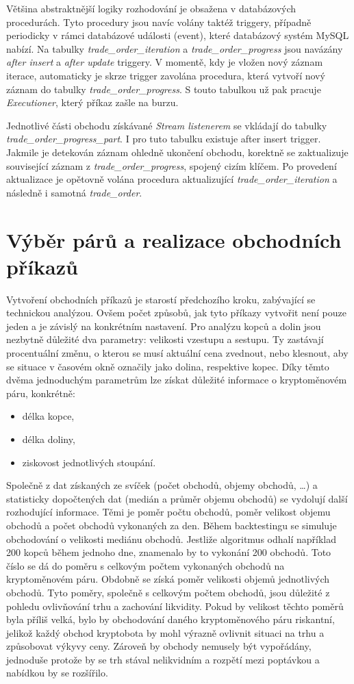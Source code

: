 Většina abstraktnější logiky rozhodování je obsažena v databázových procedurách. Tyto procedury jsou navíc volány taktéž triggery, případně periodicky v rámci databázové události (event), které
databázový systém MySQL nabízí. Na tabulky \emph{trade\_order\_iteration} a \emph{trade\_order\_progress} jsou navázány \emph{after insert} a \emph{after update} triggery. V momentě, kdy je vložen
nový záznam iterace, automaticky je skrze trigger zavolána procedura, která vytvoří nový záznam do tabulky \emph{trade\_order\_progress}. S touto tabulkou už pak pracuje \emph{Executioner}, který
příkaz zašle na burzu.

Jednotlivé části obchodu získávané \emph{Stream listenerem} se vkládají do tabulky \emph{trade\_order\_progress\_part}. I pro tuto tabulku existuje after insert trigger. Jakmile je detekován
záznam ohledně ukončení obchodu, korektně se zaktualizuje související záznam z \emph{trade\_order\_progress}, spojený cizím klíčem. Po provedení aktualizace je opětovně volána procedura aktualizující
\emph{trade\_order\_iteration} a následně i samotná \emph{trade\_order}.


\section{Výběr párů a realizace obchodních příkazů}
\label{subsec:trade-orders}
Vytvoření obchodních příkazů je starostí předchozího kroku, zabývající se technickou analýzou. Ovšem počet způsobů, jak tyto příkazy vytvořit není pouze jeden a je závislý na konkrétním
nastavení. Pro analýzu kopců a dolin jsou nezbytně důležité dva parametry: velikosti vzestupu a sestupu. Ty zastávají procentuální změnu, o kterou se musí aktuální cena zvednout, nebo klesnout,
aby se situace v časovém okně označily jako dolina, respektive kopec. Díky těmto dvěma jednoduchým parametrům lze získat důležité informace o kryptoměnovém páru, konkrétně:
\begin{itemize}
    \item délka kopce,
    \item délka doliny,
    \item ziskovost jednotlivých stoupání.
\end{itemize}
Společně z dat získaných ze svíček (počet obchodů, objemy obchodů, \ldots) a statisticky dopočtených dat (medián a průměr objemu obchodů) se vydolují další rozhodující   informace.
Těmi je poměr počtu obchodů, poměr velikost objemu obchodů a počet obchodů vykonaných za den. Během backtestingu se simuluje obchodování o velikosti mediánu obchodů. Jestliže
algoritmus odhalí například 200 kopců během jednoho dne, znamenalo by to vykonání 200 obchodů. Toto číslo se dá do poměru s celkovým počtem vykonaných obchodů na kryptoměnovém páru.
Obdobně se získá poměr velikosti objemů jednotlivých obchodů. Tyto poměry, společně s celkovým počtem obchodů, jsou důležité z pohledu ovlivňování trhu a zachování likvidity.
Pokud by velikost těchto poměrů byla příliš velká, bylo by obchodování daného kryptoměnového páru riskantní, jelikož každý obchod kryptobota by mohl výrazně ovlivnit situaci na trhu
a způsobovat výkyvy ceny. Zároveň by obchody nemusely být vypořádány, jednoduše protože by se trh stával nelikvidním a rozpětí mezi poptávkou a nabídkou by se rozšířilo.

